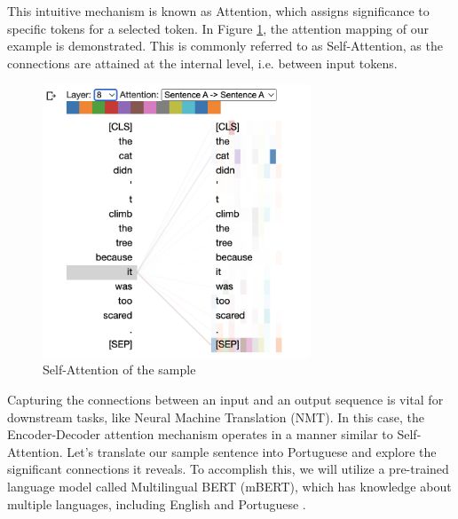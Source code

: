 This intuitive mechanism is known as Attention, which assigns significance to specific tokens for a selected token. In Figure \ref{fig:att_self_sample}, the attention mapping of our example is demonstrated. This is commonly referred to as Self-Attention, as the connections are attained at the internal level, i.e. between input tokens.

\begin{figure}[h]
    \centering
    \includegraphics[width=8cm]{pages/imgs/att_self_sample.png}
    \caption{Self-Attention of the sample}
    \label{fig:att_self_sample}
\end{figure}

Capturing the connections between an input and an output sequence is vital for downstream tasks, like Neural Machine Translation (NMT). In this case, the Encoder-Decoder attention mechanism operates in a manner similar to Self-Attention. Let's translate our sample sentence into Portuguese and explore the significant connections it reveals. To accomplish this, we will utilize a pre-trained language model called Multilingual BERT (mBERT), which has knowledge about multiple languages, including English and Portuguese \cite{devlin2018bert}.


